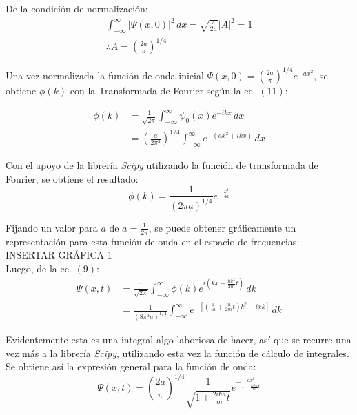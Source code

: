 De la condición de normalización:
\begin{gather*}
    \int_{-\infty}^{\infty} \lvert\Psi(x,0)\rvert^2\,dx = \sqrt{\frac{\pi}{2a}} \lvert A \rvert^2 = 1 \\
    \therefore A = \left (\frac{2a}{\pi}\right )^{1/4}
\end{gather*}

Una vez normalizada la función de onda inicial $\Psi(x,0) = \left (\frac{2a}{\pi}\right )^{1/4} e^{-ax^2}$, se obtiene 
$\phi(k)$ con la Transformada de Fourier según la ec. $(11)$:

\begin{align*}
    \phi(k) &= \frac{1}{\sqrt{2\pi}} \int_{-\infty}^{\infty} \psi_{0}(x)e^{-ikx}\,dx \\
    &= \left(\frac{a}{2\pi^3}\right)^{1/4} \int_{-\infty}^{\infty} e^{-(ax^2+ikx)}\,dx
\end{align*}

Con el apoyo de la librería \emph{Scipy} utilizando la función de transformada de Fourier, se obtiene el resultado:
\begin{equation}
    \phi(k) = \frac{1}{(2\pi a)^{1/4}} e^{-\frac{k^2}{4a}}
\end{equation}

Fijando un valor para $a$ de $a=\frac{1}{2\pi}$, se puede obtener gráficamente un representación para esta función de 
onda en el espacio de frecuencias:\\

INSERTAR GRÁFICA 1\\

Luego, de la ec. $(9)$:
\begin{align*}
    \Psi(x,t) &= \frac{1}{\sqrt{2\pi}} \int_{-\infty}^{\infty} \phi(k)e^{i(kx-\frac{\hbar k^2}{2m} t)}\,dk \\
    &= \frac{1}{(8\pi^3 a)^{1/4}} \int_{-\infty}^{\infty} e^{-\left[ \left( \frac{1}{4a}+\frac{i\hbar}{2m}t \right)k^2 - ixk\right]} \,dk
\end{align*}

Evidentemente esta es una integral algo laboriosa de hacer, así que se recurre una vez más a la librería \emph{Scipy}, 
utilizando esta vez la función de cálculo de integrales.\\
Se obtiene así la expresión general para la función de onda:
\begin{equation*}
    \Psi(x,t) = \left( \frac{2a}{\pi} \right)^{1/4} \frac{1}{\sqrt{1+\frac{2i\hbar a}{m}t}} e^{-\frac{ax^2}{1+\frac{2i\hbar a}{m}t}}
\end{equation*}

